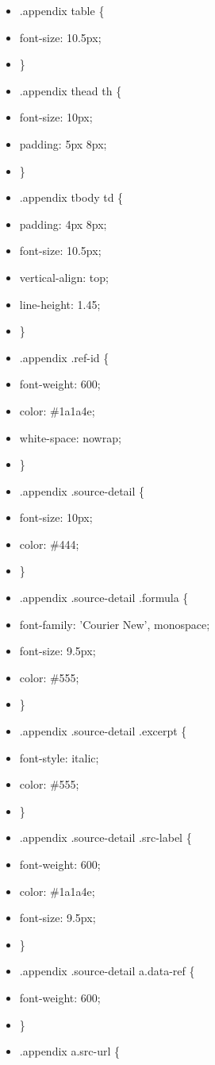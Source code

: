 \documentclass[11pt]{article}
\begin{document}
\begin{itemize}[leftmargin=*,itemsep=2pt,topsep=2pt]
\item {} .appendix table \{
\item {} font-size: 10.5px;
\item {} \}
\item {} .appendix thead th \{
\item {} font-size: 10px;
\item {} padding: 5px 8px;
\item {} \}
\item {} .appendix tbody td \{
\item {} padding: 4px 8px;
\item {} font-size: 10.5px;
\item {} vertical-align: top;
\item {} line-height: 1.45;
\item {} \}
\item {} .appendix .ref-id \{
\item {} font-weight: 600;
\item {} color: \#1a1a4e;
\item {} white-space: nowrap;
\item {} \}
\item {} .appendix .source-detail \{
\item {} font-size: 10px;
\item {} color: \#444;
\item {} \}
\item {} .appendix .source-detail .formula \{
\item {} font-family: 'Courier New', monospace;
\item {} font-size: 9.5px;
\item {} color: \#555;
\item {} \}
\item {} .appendix .source-detail .excerpt \{
\item {} font-style: italic;
\item {} color: \#555;
\item {} \}
\item {} .appendix .source-detail .src-label \{
\item {} font-weight: 600;
\item {} color: \#1a1a4e;
\item {} font-size: 9.5px;
\item {} \}
\item {} .appendix .source-detail a.data-ref \{
\item {} font-weight: 600;
\item {} \}
\item {} .appendix a.src-url \{

\end{itemize}
\end{document}
